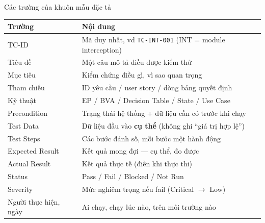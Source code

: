 \documentclass[aspectratio=169,12pt]{beamer}
\begin{document}
\begin{frame}[shrink=6]{Các trường của khuôn mẫu đặc tả}
  \begin{center}
  \small
  \renewcommand{\arraystretch}{0.95}
  \begin{tabular}{>{\raggedright\arraybackslash}p{3.2cm}>{\raggedright\arraybackslash}p{8.6cm}}
    \toprule
    \textbf{Trường} & \textbf{Nội dung} \\
    \midrule
    TC-ID          & Mã duy nhất, vd \texttt{TC-INT-001} (INT = module interception) \\
    Tiêu đề        & Một câu mô tả điều được kiểm thử \\
    Mục tiêu       & Kiểm chứng điều gì, vì sao quan trọng \\
    Tham chiếu     & ID yêu cầu / user story / dòng bảng quyết định \\
    Kỹ thuật       & EP / BVA / Decision Table / State / Use Case \\
    Precondition   & Trạng thái hệ thống + dữ liệu cần có trước khi chạy \\
    Test Data      & Dữ liệu đầu vào \textbf{cụ thể} (không ghi ``giá trị hợp lệ'') \\
    Test Steps     & Các bước đánh số, mỗi bước một hành động \\
    Expected Result& Kết quả mong đợi --- cụ thể, đo được \\
    Actual Result  & Kết quả thực tế (điền khi thực thi) \\
    Status         & Pass / Fail / Blocked / Not Run \\
    Severity       & Mức nghiêm trọng nếu fail (Critical $\to$ Low) \\
    Người thực hiện, ngày & Ai chạy, chạy lúc nào, trên môi trường nào \\
    \bottomrule
  \end{tabular}
  \renewcommand{\arraystretch}{1}
  \end{center}
\end{frame}
\end{document}
